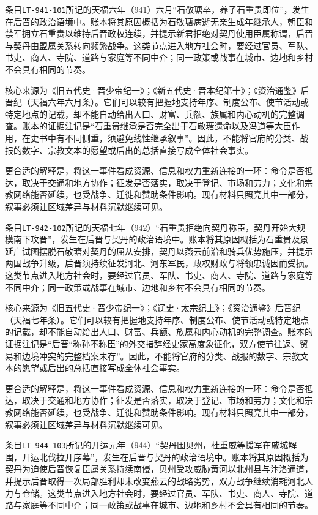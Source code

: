 条目\texttt{LT-941-101}所记的天福六年（941）六月“石敬瑭卒，养子石重贵即位”，发生在后晋的政治语境中。账本将其原因概括为石敬瑭病逝无亲生成年继承人，朝臣和禁军拥立石重贵以维持后晋政权连续，并提示新君拒绝对契丹使用臣属称谓，后晋与契丹由盟属关系转向频繁战争。这类节点进入地方社会时，要经过官员、军队、书吏、商人、寺院、道路与家庭等不同中介；同一政策或战事在城市、边地和乡村不会具有相同的节奏。

核心来源为《旧五代史·晋少帝纪一》；《新五代史·晋本纪第十》；《资治通鉴》后晋纪（天福六年六月条）。它们可以较有把握地支持年序、制度公布、使节活动或特定地点的记载，却不能自动给出人口、财富、兵额、族属和内心动机的完整调查。账本的证据注记是“石重贵继承是否完全出于石敬瑭遗命以及冯道等大臣作用，在史书中有不同侧重，须避免线性继承叙事”。因此，不能将官府的分类、战报的数字、宗教文本的愿望或后出的总括直接写成全体社会事实。

更合适的解释是，将这一事件看成资源、信息和权力重新连接的一环：命令是否抵达，取决于交通和地方协作；征发是否落实，取决于登记、市场和劳力；文化和宗教网络能否延续，也受战争、迁徙和赞助条件影响。现有材料只照亮其中一部分，叙事必须让区域差异与材料沉默继续可见。

条目\texttt{LT-942-102}所记的天福七年（942）“石重贵拒绝向契丹称臣，契丹开始大规模南下攻晋”，发生在后晋与契丹的政治语境中。账本将其原因概括为石重贵及景延广试图摆脱石敬瑭对契丹的屈从安排，契丹以燕云前沿和骑兵优势施压，并提示两国战争升级，后晋须持续征发河北、河东军民，政权财政与将领忠诚因而受损。这类节点进入地方社会时，要经过官员、军队、书吏、商人、寺院、道路与家庭等不同中介；同一政策或战事在城市、边地和乡村不会具有相同的节奏。

核心来源为《旧五代史·晋少帝纪一》；《辽史·太宗纪上》；《资治通鉴》后晋纪（天福七年条）。它们可以较有把握地支持年序、制度公布、使节活动或特定地点的记载，却不能自动给出人口、财富、兵额、族属和内心动机的完整调查。账本的证据注记是“后晋“称孙不称臣”的外交措辞经史家高度象征化，双方使节往返、贸易和边境冲突的完整档案未存”。因此，不能将官府的分类、战报的数字、宗教文本的愿望或后出的总括直接写成全体社会事实。

更合适的解释是，将这一事件看成资源、信息和权力重新连接的一环：命令是否抵达，取决于交通和地方协作；征发是否落实，取决于登记、市场和劳力；文化和宗教网络能否延续，也受战争、迁徙和赞助条件影响。现有材料只照亮其中一部分，叙事必须让区域差异与材料沉默继续可见。

条目\texttt{LT-944-103}所记的开运元年（944）“契丹围贝州，杜重威等援军在戚城解围，开运北伐拉开序幕”，发生在后晋与契丹的政治语境中。账本将其原因概括为契丹为迫使后晋恢复臣属关系持续南侵，贝州受攻威胁黄河以北州县与汴洛通道，并提示后晋取得一次局部胜利却未改变燕云的战略劣势，双方战争继续消耗河北人力与仓储。这类节点进入地方社会时，要经过官员、军队、书吏、商人、寺院、道路与家庭等不同中介；同一政策或战事在城市、边地和乡村不会具有相同的节奏。

